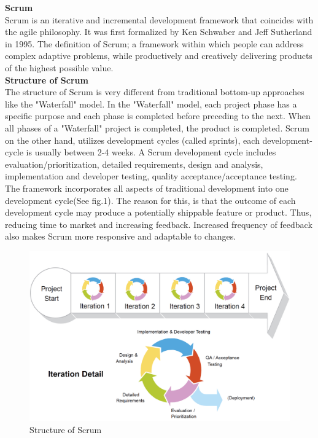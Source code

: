 \textbf{\LARGE Scrum} \\ 

Scrum is an iterative and incremental development framework that coincides with the agile philosophy. It was first formalized by Ken Schwaber and Jeff Sutherland in 1995. The definition of Scrum; a framework within which people can address complex adaptive problems, while productively and creatively delivering products of the highest possible value\cite{Scrumguides}. \\

\textbf{\large Structure of Scrum}\\
The structure of Scrum is very different from traditional bottom-up approaches like the "Waterfall" model. In the "Waterfall" model, each project phase has a specific purpose and each phase is completed before preceding to the next. When all phases of a "Waterfall" project is completed, the product is completed. Scrum on the other hand, utilizes development cycles (called sprints), each development-cycle is usually between 2-4 weeks. A Scrum development cycle includes evaluation/prioritization, detailed requirements, design and analysis, implementation and developer testing, quality acceptance/acceptance testing. The framework incorporates all aspects of traditional development into one development cycle(See fig.1). The reason for this, is that the outcome of each development cycle may produce a potentially shippable feature or product. Thus, reducing time to market and increasing feedback. Increased frequency of feedback also makes Scrum more responsive and adaptable to changes.   

\begin{figure}[H]
\includegraphics[scale=0.81]{VAPIQ-PICTURES/ScrumProcess.PNG}
 \caption*{Structure of Scrum}
\end{figure}

